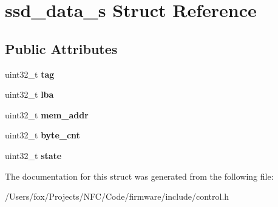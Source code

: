 \hypertarget{structssd__data__s}{
\section{ssd\_\-data\_\-s Struct Reference}
\label{structssd__data__s}
}
\subsection*{Public Attributes}
\begin{DoxyCompactItemize}
\item 
\hypertarget{structssd__data__s_a22bc1c8ffd86ffc6fe1344e23529fa52}{
uint32\_\-t {\bfseries tag}}
\label{structssd__data__s_a22bc1c8ffd86ffc6fe1344e23529fa52}

\item 
\hypertarget{structssd__data__s_a81b111bbd8147c3298346421b5017193}{
uint32\_\-t {\bfseries lba}}
\label{structssd__data__s_a81b111bbd8147c3298346421b5017193}

\item 
\hypertarget{structssd__data__s_ad00b33511eca43a39618c9e561f35b0b}{
uint32\_\-t {\bfseries mem\_\-addr}}
\label{structssd__data__s_ad00b33511eca43a39618c9e561f35b0b}

\item 
\hypertarget{structssd__data__s_af3392abe6fe093f4251c0a3f840ffcf5}{
uint32\_\-t {\bfseries byte\_\-cnt}}
\label{structssd__data__s_af3392abe6fe093f4251c0a3f840ffcf5}

\item 
\hypertarget{structssd__data__s_a4b900569fbd5d71ce0f682742282829e}{
uint32\_\-t {\bfseries state}}
\label{structssd__data__s_a4b900569fbd5d71ce0f682742282829e}

\end{DoxyCompactItemize}


The documentation for this struct was generated from the following file:\begin{DoxyCompactItemize}
\item 
/Users/fox/Projects/NFC/Code/firmware/include/control.h\end{DoxyCompactItemize}
